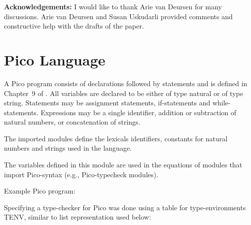 

$$$$
{\bf Acknowledgements:} I would like to thank Arie van Deursen
for many discussions. Arie van Deursen and Susan Uskudarli
provided comments and constructive help with the drafts of the paper. 

%


\newpage
\appendix

\section{Pico Language}
\label{PICOSYN}

A Pico program consists of declarations followed by statements 
and is defined in Chapter~9 of \cite{BHK89}.
All variables are declared to be either of type natural or
of type string. Statements may be assignment statements,
if-statements and while-statements.
Expressions may be a single identifier, addition or subtraction
of natural numbers, or concatenation of strings.

The imported modules define the lexicals identifiers,
constants for natural numbers and strings used in the language.

The variables defined in this module are used in the
equations of modules that import Pico-syntax 
(e.g., Pico-typecheck modules).



\newpage

Example Pico program:


Specifying a type-checker for Pico was done using a table
for type-environments TENV, similar to list representation used below:





